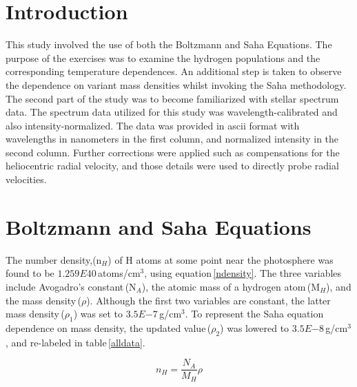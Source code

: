 \documentclass[onecolumn]{aastex6}
\begin{document}



\section{Introduction}

This study involved the use of both the Boltzmann and Saha Equations. The purpose of the exercises was to examine the hydrogen populations and the corresponding temperature dependences. An additional step is taken to observe the dependence on variant mass densities whilst invoking the Saha methodology.
\\
\indent The second part of the study was to become familiarized with stellar spectrum data. The spectrum data utilized for this study was wavelength-calibrated and also intensity-normalized. The data was provided in ascii format with wavelengths in nanometers in the first column, and normalized intensity in the second column. Further corrections were applied such as compensations for the heliocentric radial velocity, and those details were used to directly probe radial velocities.

\section{Boltzmann and Saha Equations}

The number density,(n$_H$) of H atoms at some point near the photosphere was found to be $1.259E{40}$\,atoms/cm$^{3}$, using equation\,\ref{ndensity}. The three variables include Avogadro's constant\,(N$_A$), the atomic mass of a hydrogen atom\,(M$_H$), and the mass density\,($\rho$). Although the first two variables are constant, the latter mass density\,($\rho_1$) was set to $3.5E{-7}$\,g/cm$^3$. To represent the Saha equation dependence on mass density, the updated value\,($\rho_2$) was lowered to $3.5E{-8}$\,g/cm$^3$, and re-labeled in table\,\ref{alldata}.


\begin{equation}
n_H = \frac{N_A}{M_H}\rho
\label{ndensity}
\end{equation}
\end{document}
